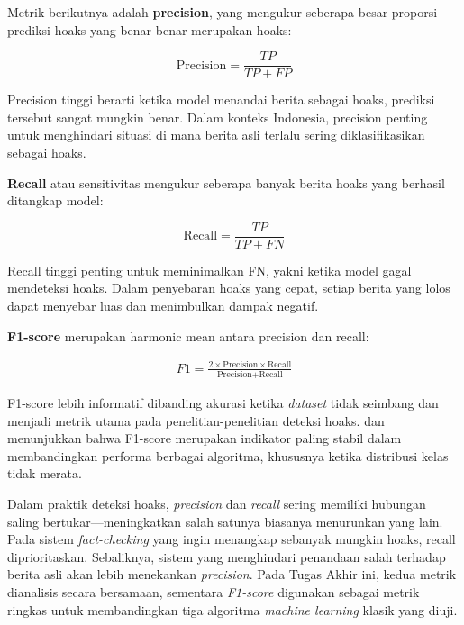 Metrik berikutnya adalah \textbf{precision}, yang mengukur seberapa besar proporsi prediksi hoaks yang benar-benar merupakan hoaks:

\begin{equation}
\text{Precision} = \frac{TP}{TP + FP} \label{eq=rumus-precision}
\end{equation}

Precision tinggi berarti ketika model menandai berita sebagai hoaks, prediksi tersebut sangat mungkin benar. Dalam konteks Indonesia, precision penting untuk menghindari situasi di mana berita asli terlalu sering diklasifikasikan sebagai hoaks.

\textbf{Recall} atau sensitivitas mengukur seberapa banyak berita hoaks yang berhasil ditangkap model:

\begin{equation}
\text{Recall} = \frac{TP}{TP + FN} \label{eq=rumus-recall}
\end{equation}

Recall tinggi penting untuk meminimalkan FN, yakni ketika model gagal mendeteksi hoaks. Dalam penyebaran hoaks yang cepat, setiap berita yang lolos dapat menyebar luas dan menimbulkan dampak negatif.

\textbf{F1-score} merupakan harmonic mean antara precision dan recall:

\begin{align}
F1 = 
\frac{
2 \times \text{Precision} \times \text{Recall}
}{
\text{Precision} + \text{Recall} \label{eq=rumus-f1-score}
}
\end{align}

F1-score lebih informatif dibanding akurasi ketika \textit{dataset} tidak seimbang dan menjadi metrik utama pada penelitian-penelitian deteksi hoaks. \textcite{triyono2023indonesian} dan \textcite{safira2023comparative} menunjukkan bahwa F1-score merupakan indikator paling stabil dalam membandingkan performa berbagai algoritma, khususnya ketika distribusi kelas tidak merata.

Dalam praktik deteksi hoaks, \textit{precision} dan \textit{recall} sering memiliki hubungan saling bertukar—meningkatkan salah satunya biasanya menurunkan yang lain. Pada sistem \textit{fact-checking} yang ingin menangkap sebanyak mungkin hoaks, recall diprioritaskan. Sebaliknya, sistem yang menghindari penandaan salah terhadap berita asli akan lebih menekankan \textit{precision}. Pada Tugas Akhir ini, kedua metrik dianalisis secara bersamaan, sementara \textit{F1-score} digunakan sebagai metrik ringkas untuk membandingkan tiga algoritma \textit{machine learning} klasik yang diuji.


